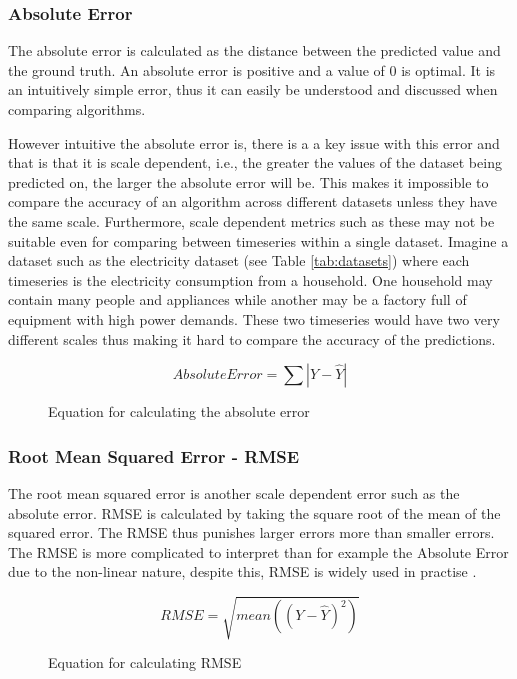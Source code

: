 \subsubsection{Absolute Error}
The absolute error is calculated as the distance between the predicted value and the ground truth. An absolute error is positive and a value of 0 is optimal. It is an intuitively simple error, thus it can easily be understood and discussed when comparing algorithms.

However intuitive the absolute error is, there is a a key issue with this error and that is that it is scale dependent, i.e., the greater the values of the dataset being predicted on, the larger the absolute error will be. This makes it impossible to compare the accuracy of an algorithm across different datasets unless they have the same scale. \cite{hyndman_forecasting_3rd} Furthermore, scale dependent metrics such as these may not be suitable even for comparing between timeseries within a single dataset. Imagine a dataset such as the electricity dataset (see Table \ref{tab:datasets}) where each timeseries is the electricity consumption from a household. One household may contain many people and appliances while another may be a factory full of equipment with high power demands. These two timeseries would have two very different scales thus making it hard to compare the accuracy of the predictions.

\begin{figure}[h]
  \[Absolute Error = \sum|Y - \hat{Y}|\]
  \caption{Equation for calculating the absolute error}
  \label{eq:abs_error}
\end{figure}

\subsubsection{Root Mean Squared Error - RMSE}
\label{sec:RMSE}
The root mean squared error is another scale dependent error such as the absolute error. RMSE is calculated by taking the square root of the mean of the squared error. The RMSE thus punishes larger errors more than smaller errors. The RMSE is more complicated to interpret than for example the Absolute Error due to the non-linear nature, despite this, RMSE is widely used in practise \cite{hyndman_forecasting_3rd,gluonts-github}.

\begin{figure}[h]
  \[RMSE = \sqrt{mean((Y - \hat{Y})^2)}\]
  \caption{Equation for calculating RMSE}
  \label{eq:RMSE}
\end{figure}


